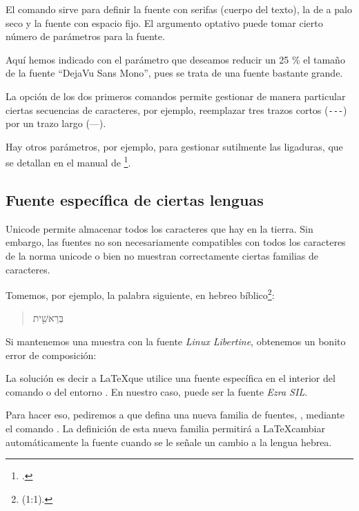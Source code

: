 El comando  sirve para definir la fuente con serifas (cuerpo del texto),  la de a palo seco y  la fuente con espacio fijo. El argumento optativo puede tomar cierto número de parámetros para la fuente. 

Aquí hemos indicado con el parámetro  que deseamos reducir un 25 \% el tamaño de la fuente \enquote{DejaVu Sans Mono}, pues se trata de una fuente bastante grande. 

La opción  de los dos primeros comandos permite gestionar de manera particular ciertas secuencias de caracteres, por ejemplo, reemplazar tres trazos cortos (\verb|---|) por un trazo largo (---). 

Hay otros parámetros, por ejemplo, para gestionar sutilmente las ligaduras, que se detallan en el manual de \footcite{fontspec_optionspolices}.

\subsection{Fuente específica de ciertas lenguas}\label{policenonlatine}

Unicode permite almacenar todos los caracteres que hay en la tierra. Sin embargo, las fuentes no son necesariamente compatibles con todos los caracteres de la norma unicode o bien no muestran correctamente ciertas familias de caracteres. 

Tomemos, por ejemplo, la palabra siguiente, en hebreo bíblico\footnote{(1:1).}:

\begin{quotation}
\texthebrew{בְּרֵאשִׁ֖ית}
\end{quotation}

Si mantenemos una muestra con la fuente \emph{Linux Libertine}, obtenemos un bonito error de composición:

\begin{quotation}
\texthebrew{}
\end{quotation}

La solución es decir a \LaTeX que utilice una fuente específica en el interior del comando  o del entorno . En nuestro caso, puede ser la fuente \emph{Ezra SIL}.

Para hacer eso, pediremos a  que defina una nueva familia de fuentes, \csp{\hebrewfont}, mediante el comando . La definición de esta nueva familia permitirá a  \LaTeX cambiar automáticamente la fuente cuando se le señale un cambio a la lengua hebrea.

